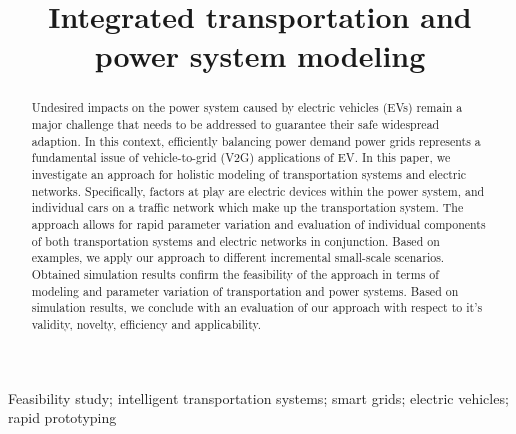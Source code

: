 \title{Integrated transportation and power system modeling}

\author{
	\and
}

\maketitle

\begin{abstract}
Undesired impacts on the power system caused by electric vehicles (EVs) remain a major challenge that needs to be addressed to guarantee their safe widespread adaption. In this context, efficiently balancing power demand power grids represents a fundamental issue of vehicle-to-grid (V2G) applications of EV. In this paper, we investigate an approach for holistic modeling of transportation systems and electric networks. Specifically, factors at play are electric devices within the power system, and individual cars on a traffic network which make up the transportation system. The approach allows for rapid parameter variation and evaluation of individual components of both transportation systems and electric networks in conjunction. Based on examples, we apply our approach to different incremental small-scale scenarios. Obtained simulation results confirm the feasibility of the approach in terms of modeling and parameter variation of transportation and power systems. Based on simulation results, we conclude with an evaluation of our approach with respect to it's validity, novelty, efficiency and applicability.
\end{abstract}

\begin{keywords}
Feasibility study; intelligent transportation systems; smart grids; electric vehicles;  rapid prototyping
\end{keywords}